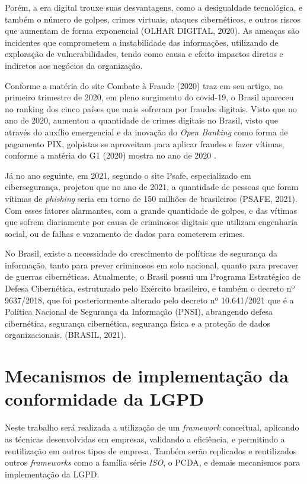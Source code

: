 \documentclass[
	12pt,				%
	openright,			%
	oneside,			%
	a4paper,			%
	english,			%
	french,				%
	spanish,			%
	brazil,				%
	]{abntex2}
\begin{document}
Porém, a era digital trouxe suas desvantagens, como a desigualdade tecnológica, e também o número de golpes, crimes virtuais, ataques cibernéticos, e outros riscos que aumentam de forma exponencial (OLHAR DIGITAL, 2020). As ameaças são incidentes que comprometem a instabilidade das informações, utilizando de exploração de vulnerabilidades, tendo como causa e efeito impactos diretos e indiretos aos negócios da organização.

Conforme a matéria do site Combate à Fraude (2020) traz em seu artigo, no primeiro trimestre de 2020, em pleno surgimento do covid-19, o Brasil apareceu no ranking dos cinco países que mais sofreram por fraudes digitais. Visto que no ano de 2020, aumentou a quantidade de crimes digitais no Brasil, visto que através do auxílio emergencial e da inovação do \textit{Open Banking} como forma de pagamento PIX, golpistas se aproveitam para aplicar fraudes e fazer vítimas, conforme a matéria do G1 (2020) mostra no ano de 2020 .

Já no ano seguinte, em 2021, segundo o site Psafe, especializado em cibersegurança, projetou que no ano de 2021, a quantidade de pessoas que foram vítimas de \textit{phishing} seria em torno de 150 milhões de brasileiros (PSAFE, 2021). Com esses fatores alarmantes, com a grande quantidade de golpes, e das vítimas que sofrem diariamente por causa de criminosos digitais que utilizam engenharia social, ou de falhas e vazamento de dados para cometerem crimes. 

No Brasil, existe a necessidade do crescimento de políticas de segurança da informação, tanto para prever criminosos em solo nacional, quanto para precaver de guerras cibernéticas. Atualmente, o Brasil possui um Programa Estratégico de Defesa Cibernética, estruturado pelo Exército brasileiro, e também o decreto nº 9637/2018, que foi posteriormente alterado pelo decreto nº 10.641/2021 que é a Política Nacional de Segurança da Informação (PNSI), abrangendo defesa cibernética, segurança cibernética, segurança física e a proteção de dados organizacionais. (BRASIL, 2021).

\section{Mecanismos de implementação da conformidade da LGPD}

Neste trabalho será realizada a utilização de um \textit{framework} conceitual, aplicando as técnicas desenvolvidas em empresas, validando a eficiência, e permitindo a reutilização em outros tipos de empresa. Também serão replicados e reutilizados outros \textit{frameworks} como a família série \textit{ISO}, o PCDA, e demais mecanismos para implementação da LGPD. 
\end{document}
